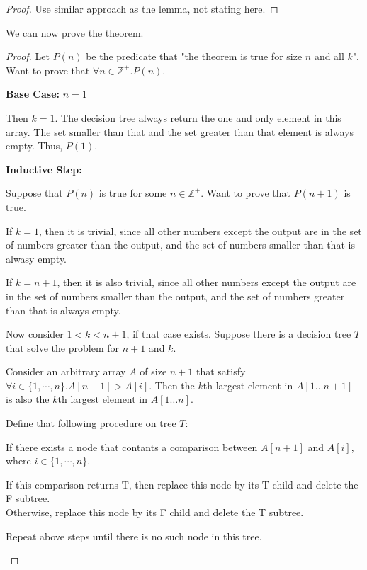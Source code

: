 \documentclass[10pt]{article}
\begin{document}
\begin{enumerate}
	\begin{proof}
	Use similar approach as the lemma, not stating here.
	\end{proof}

	We can now prove the theorem.
	\begin{proof}
	Let $P(n)$ be the predicate that "the theorem is true for size $n$ and all $k$".
	Want to prove that $\forall n \in \mathbb{Z}^+. P(n)$. 

	\textbf{Base Case:} $n=1$
	\begin{addmargin}[1em]{0em}
		Then $k=1$. 
		The decision tree always return the one and only element in this array.
		The set smaller than that and the set greater than that element is always empty.
		Thus, $P(1)$.
	\end{addmargin}

	\textbf{Inductive Step:}
	\begin{addmargin}[1em]{0em}
		Suppose that $P(n)$ is true for some $n \in \mathbb{Z}^+$. 
		Want to prove that $P(n+1)$ is true.

		If $k = 1$, then it is trivial,
		since all other numbers except the output are in the set of numbers greater than the output,
		and the set of numbers smaller than that is alwasy empty.

		If $k = n+1$, then it is also trivial, 
		since all other numbers except the output are in the set of numbers smaller than the output, 
		and the set of numbers greater than that is always empty.

		Now consider $1 < k < n+1$, if that case exists.
		Suppose there is a decision tree $T$ that solve the problem for $n+1$ and $k$.

		Consider an arbitrary array $A$ of size $n+1$ that satisfy $\forall i \in \{1, \cdots, n\}. A[n+1] > A[i]$.
		Then the $k$th largest element in $A[1 \ldots n+1]$ is also 
		the $k$th largest element in $A[1 \ldots n]$.

		Define that following procedure on tree $T$:
		\begin{addmargin}[1em]{0em}
			If there exists a node that contants a comparison between $A[n+1]$ and $A[i]$, 
			where $i \in \{1, \cdots, n\}$.

			If this comparison returns T, then replace this node by its T child and delete the F subtree. \\
			Otherwise, replace this node by its F child and delete the T subtree.

			Repeat above steps until there is no such node in this tree.
		\end{addmargin}


\end{addmargin}
\end{proof}
\end{enumerate}
\end{document}
